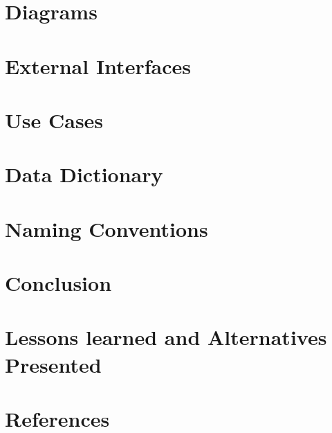 \documentclass[12pt]{article}
\begin{document}
\section{Diagrams}

\section{External Interfaces}

\section{Use Cases}

\section{Data Dictionary}

\section{Naming Conventions}

\section{Conclusion}

\section{Lessons learned and Alternatives Presented}

\section{References}
\end{document}
